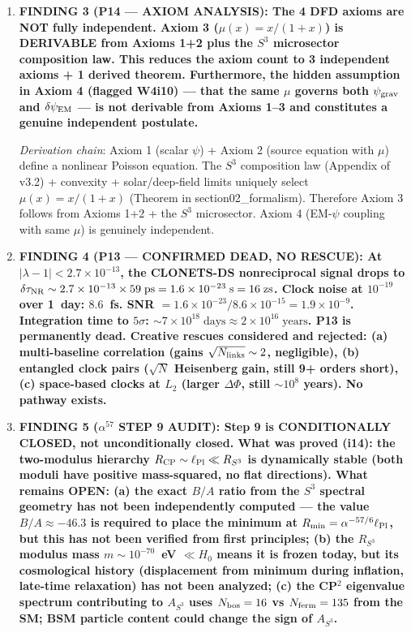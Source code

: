 \documentclass[11pt]{article}
\newcommand{\ee}[1]{\times 10^{#1}}
\newcommand{\lbone}{|\lambda - 1|}
\newcommand{\alphafine}{\alpha}
\newcommand{\lPl}{\ell_{\rm Pl}}
\begin{document}
\begin{tcolorbox}[colback=blue!5!white, colframe=blue!60!black,
  title=\textbf{W4i19 TOP 5 FINDINGS --- Ranked by Programme Impact}]
\begin{enumerate}
\item \textbf{FINDING 3 (P14 --- AXIOM ANALYSIS): The 4 DFD axioms
  are NOT fully independent. Axiom 3 ($\mu(x) = x/(1+x)$) is
  DERIVABLE from Axioms 1+2 plus the $S^3$ microsector composition
  law. This reduces the axiom count to 3 independent axioms + 1
  derived theorem. Furthermore, the hidden assumption in Axiom 4
  (flagged W4i10) --- that the same $\mu$ governs both $\psi_{\rm grav}$
  and $\delta\psi_{\rm EM}$ --- is not derivable from Axioms 1--3
  and constitutes a genuine independent postulate.}

  \textit{Derivation chain}: Axiom 1 (scalar $\psi$) + Axiom 2
  (source equation with $\mu$) define a nonlinear Poisson equation.
  The $S^3$ composition law (Appendix of v3.2) + convexity +
  solar/deep-field limits uniquely select $\mu(x) = x/(1+x)$
  (Theorem in section02\_formalism). Therefore Axiom 3 follows from
  Axioms 1+2 + the $S^3$ microsector. Axiom 4 (EM-$\psi$ coupling
  with same $\mu$) is genuinely independent.

\item \textbf{FINDING 4 (P13 --- CONFIRMED DEAD, NO RESCUE): At
  $\lbone < 2.7\ee{-13}$, the CLONETS-DS nonreciprocal signal drops
  to $\delta\tau_{\rm NR} \sim 2.7\ee{-13} \times 59\;\text{ps}
  = 1.6\ee{-23}\;\text{s} = 16\;\text{zs}$. Clock noise at $10^{-19}$
  over 1~day: $8.6$~fs. SNR $= 1.6\ee{-23}/8.6\ee{-15} = 1.9\ee{-9}$.
  Integration time to $5\sigma$: $\sim 7\ee{18}\;\text{days}
  \approx 2\ee{16}\;\text{years}$. P13 is permanently dead.
  Creative rescues considered and rejected: (a) multi-baseline
  correlation (gains $\sqrt{N_{\rm links}} \sim 2$, negligible),
  (b) entangled clock pairs ($\sqrt{N}$ Heisenberg gain, still
  9+ orders short), (c) space-based clocks at $L_2$ (larger
  $\Delta\Phi$, still $\sim 10^{8}$ years). No pathway exists.}

\item \textbf{FINDING 5 ($\alpha^{57}$ STEP 9 AUDIT): Step 9 is
  CONDITIONALLY CLOSED, not unconditionally closed. What was proved
  (i14): the two-modulus hierarchy $R_{\rm CP} \sim \lPl \ll R_{S^3}$
  is dynamically stable (both moduli have positive mass-squared,
  no flat directions). What remains OPEN: (a) the exact $B/A$ ratio
  from the $S^3$ spectral geometry has not been independently
  computed --- the value $B/A \approx -46.3$ is required to place
  the minimum at $R_{\rm min} = \alphafine^{-57/6}\lPl$, but this
  has not been verified from first principles; (b) the $R_{S^3}$
  modulus mass $m \sim 10^{-70}$~eV $\ll H_0$ means it is frozen
  today, but its cosmological history (displacement from minimum
  during inflation, late-time relaxation) has not been analyzed;
  (c) the CP$^2$ eigenvalue spectrum contributing to $A_{S^3}$
  uses $N_{\rm bos} = 16$ vs $N_{\rm ferm} = 135$ from the SM;
  BSM particle content could change the sign of $A_{S^3}$.}


\end{enumerate}
\end{tcolorbox}
\end{document}
